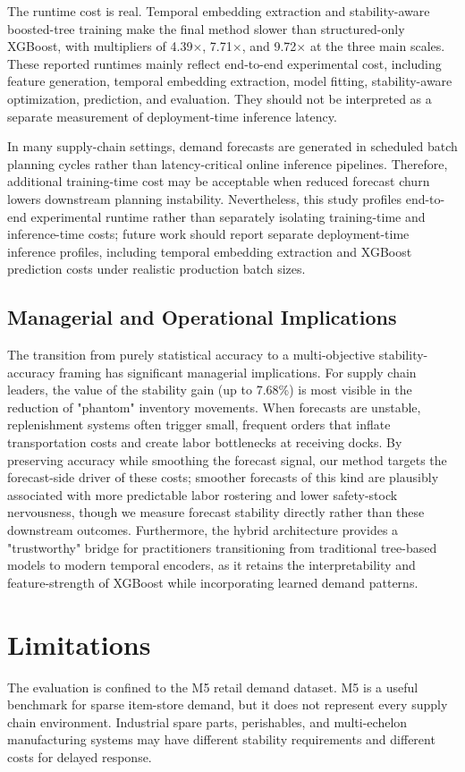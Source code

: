 \documentclass[10pt,conference]{IEEEtran}
\begin{document}
The runtime cost is real. Temporal embedding extraction and stability-aware boosted-tree training make the final method slower than structured-only XGBoost, with multipliers of 4.39$\times$, 7.71$\times$, and 9.72$\times$ at the three main scales. These reported runtimes mainly reflect end-to-end experimental cost, including feature generation, temporal embedding extraction, model fitting, stability-aware optimization, prediction, and evaluation. They should not be interpreted as a separate measurement of deployment-time inference latency.

In many supply-chain settings, demand forecasts are generated in scheduled batch planning cycles rather than latency-critical online inference pipelines. Therefore, additional training-time cost may be acceptable when reduced forecast churn lowers downstream planning instability. Nevertheless, this study profiles end-to-end experimental runtime rather than separately isolating training-time and inference-time costs; future work should report separate deployment-time inference profiles, including temporal embedding extraction and XGBoost prediction costs under realistic production batch sizes.

\FloatBarrier
\subsection{Managerial and Operational Implications}
The transition from purely statistical accuracy to a multi-objective stability-accuracy framing has significant managerial implications. For supply chain leaders, the value of the stability gain (up to 7.68\%) is most visible in the reduction of "phantom" inventory movements. When forecasts are unstable, replenishment systems often trigger small, frequent orders that inflate transportation costs and create labor bottlenecks at receiving docks. By preserving accuracy while smoothing the forecast signal, our method targets the forecast-side driver of these costs; smoother forecasts of this kind are plausibly associated with more predictable labor rostering and lower safety-stock nervousness, though we measure forecast stability directly rather than these downstream outcomes. Furthermore, the hybrid architecture provides a "trustworthy" bridge for practitioners transitioning from traditional tree-based models to modern temporal encoders, as it retains the interpretability and feature-strength of XGBoost while incorporating learned demand patterns.

\section{Limitations}
The evaluation is confined to the M5 retail demand dataset. M5 is a useful benchmark for sparse item-store demand, but it does not represent every supply chain environment. Industrial spare parts, perishables, and multi-echelon manufacturing systems may have different stability requirements and different costs for delayed response.
\end{document}
